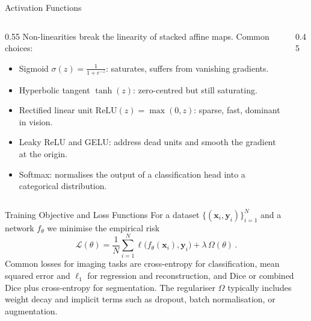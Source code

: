 \begin{frame}{Activation Functions}
    \begin{columns}[T, onlytextwidth]
        \begin{column}{0.55\textwidth}
            Non-linearities break the linearity of stacked affine maps. Common choices:
            \begin{itemize}
                \item Sigmoid $\sigma(z) = \tfrac{1}{1+e^{-z}}$: saturates, suffers from vanishing gradients.
                \item Hyperbolic tangent $\tanh(z)$: zero-centred but still saturating.
                \item Rectified linear unit $\mathrm{ReLU}(z) = \max(0, z)$: sparse, fast, dominant in vision.
                \item Leaky ReLU and GELU: address dead units and smooth the gradient at the origin.
                \item Softmax: normalises the output of a classification head into a categorical distribution.
            \end{itemize}
        \end{column}
        \begin{column}{0.45\textwidth}
        \end{column}
    \end{columns}
\end{frame}

\begin{frame}{Training Objective and Loss Functions}
    For a dataset $\{(\mathbf{x}_i, \mathbf{y}_i)\}_{i=1}^N$ and a network $f_\theta$ we minimise the empirical risk
    \begin{equation*}
        \mathcal{L}(\theta) = \frac{1}{N} \sum_{i=1}^N \ell\bigl(f_\theta(\mathbf{x}_i), \mathbf{y}_i\bigr) + \lambda\, \Omega(\theta)\,.
    \end{equation*}
    Common losses for imaging tasks are cross-entropy for classification, mean squared error and $\ell_1$ for regression and reconstruction, and Dice or combined Dice plus cross-entropy for segmentation. The regulariser $\Omega$ typically includes weight decay and implicit terms such as dropout, batch normalisation, or augmentation.
\end{frame}

